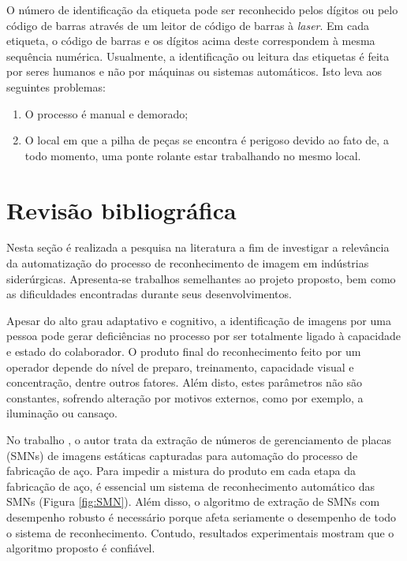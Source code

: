 O número de identificação da etiqueta pode ser reconhecido pelos dígitos ou pelo código de barras através de um leitor de código de barras à \textit{laser}. Em cada etiqueta, o código de barras e os dígitos acima deste correspondem à mesma sequência numérica. Usualmente, a identificação ou leitura das etiquetas é feita por seres humanos e não por máquinas ou sistemas automáticos. Isto leva aos seguintes problemas:

\begin{enumerate}
	\item O processo é manual e demorado;
	\item O local em que a pilha de peças se encontra é perigoso devido ao fato de, a todo momento, uma ponte rolante estar trabalhando no mesmo local.
\end{enumerate}

\section{Revisão bibliográfica} 

Nesta seção é realizada a pesquisa na literatura a fim de investigar a relevância da automatização do processo de reconhecimento de imagem em indústrias siderúrgicas. Apresenta-se trabalhos semelhantes ao projeto proposto, bem como as dificuldades encontradas durante seus desenvolvimentos. 

Apesar do alto grau adaptativo e cognitivo, a identificação de imagens por uma pessoa pode gerar deficiências no processo por ser totalmente ligado à capacidade e estado do colaborador. O produto final do reconhecimento feito por um operador depende do nível de preparo, treinamento, capacidade visual e concentração, dentre outros fatores. \cite{refbib1} 
%
Além disto, estes parâmetros não são constantes, sofrendo alteração por motivos externos, como por exemplo, a iluminação ou cansaço. \cite{refbib2, refbib3}

No trabalho \citeauthor{ref1}, o autor trata da extração de números de gerenciamento de placas (SMNs) de imagens estáticas capturadas para automação do processo de fabricação de aço. Para impedir a mistura do produto em cada etapa da fabricação de aço, é essencial um sistema de reconhecimento automático das SMNs (Figura \ref{fig:SMN}). Além disso, o algoritmo de extração de SMNs com desempenho robusto é necessário porque afeta seriamente o desempenho de todo o sistema de reconhecimento. Contudo, resultados experimentais mostram que o algoritmo proposto é confiável. 


